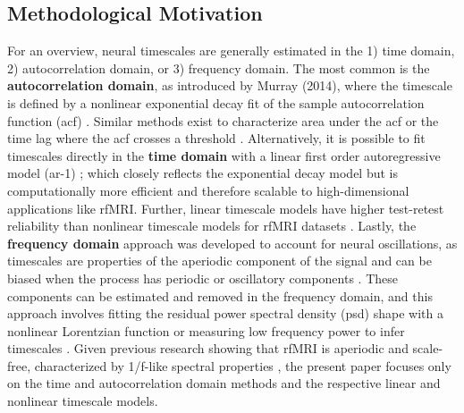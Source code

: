\documentclass[latex/main.tex]{subfiles}
\begin{document}
\subsection{Methodological Motivation}
For an overview, neural timescales are generally estimated in the 1) time domain, 2) autocorrelation domain, or 3) frequency domain. The most common is the \textbf{autocorrelation domain}, as introduced by Murray (2014), where the timescale is defined by a nonlinear exponential decay fit of the sample autocorrelation function (acf) \cite{murray_hierarchy_2014, rossi-pool_invariant_2021, cirillo_neural_2018, ito_cortical_2020, runyan_distinct_2017, zeraati_flexible_2022, nougaret_intrinsic_2021, wasmuht_intrinsic_2018, muller_core_2020, maisson_choice-relevant_2021, li_hierarchical_2022, shafiei_topographic_2020}. Similar methods exist to characterize area under the acf \cite{wengler_distinct_2020, manea_intrinsic_2022, watanabe_atypical_2019} or the time lag where the acf crosses a threshold \cite{zilio_are_2021, raut_hierarchical_2020, golesorkhi_temporal_2021}. Alternatively, it is possible to fit timescales directly in the \textbf{time domain} with a linear first order autoregressive model (ar-1) \cite{kaneoke_variance_2012, meisel_decline_2017, huang_timescales_2018, lurie_cortical_2024, shinn_functional_2023, shafiei_topographic_2020}; which closely reflects the exponential decay model \cite{murray_hierarchy_2014} but is computationally more efficient and therefore scalable to high-dimensional applications like rfMRI. Further, linear timescale models have higher test-retest reliability than nonlinear timescale models for rfMRI datasets \cite{huang_timescales_2018, lurie_cortical_2024}. Lastly, the \textbf{frequency domain} approach was developed to account for neural oscillations, as timescales are properties of the aperiodic component of the signal and can be biased when the process has periodic or oscillatory components \cite{donoghue_parameterizing_2020, gao_neuronal_2020}. These components can be estimated and removed in the frequency domain, and this approach involves fitting the residual power spectral density (psd) shape with a nonlinear Lorentzian function or measuring low frequency power to infer timescales \cite{gao_neuronal_2020, manea_neural_2024, zeraati_flexible_2022, fallon_timescales_2020}. Given previous research showing that rfMRI is aperiodic and scale-free, characterized by 1/f-like spectral properties \cite{he_scale-free_2011, he_temporal_2010}, the present paper focuses only on the time and autocorrelation domain methods and the respective linear and nonlinear timescale models.\\ 
\end{document}
